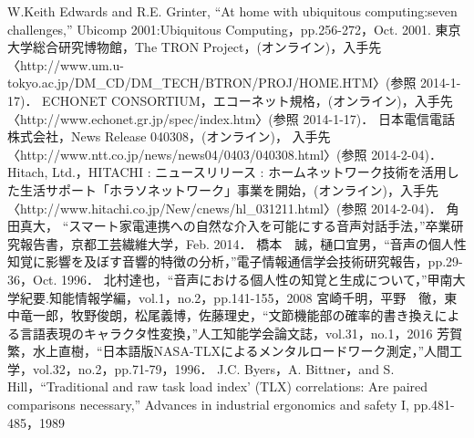 \documentclass[a4j,12pt,twoside]{jreport}
\begin{document}
\begin{thebibliography}{}
   W.Keith Edwards and R.E. Grinter, ``At home with ubiquitous computing:seven challenges,'' Ubicomp 2001:Ubiquitous Computing，pp.256-272，Oct. 2001.
   東京大学総合研究博物館，The TRON Project，(オンライン)，入手先〈http://www.um.u-tokyo.ac.jp/DM\_CD/DM\_TECH/BTRON/PROJ/HOME.HTM〉(参照 2014-1-17)．
   ECHONET CONSORTIUM，エコーネット規格，(オンライン)，入手先〈http://www.echonet.gr.jp/spec/index.htm〉(参照 2014-1-17)．
   日本電信電話株式会社，News Release 040308，(オンライン)， 入手先〈http://www.ntt.co.jp/news/news04/0403/040308.html〉(参照 2014-2-04)．
   Hitach, Ltd.，HITACHI : ニュースリリース : ホームネットワーク技術を活用した生活サポート「ホラソネットワーク」事業を開始，(オンライン)，入手先〈http://www.hitachi.co.jp/New/cnews/hl\_031211.html〉(参照 2014-2-04)．
   角田真大， ``スマート家電連携への自然な介入を可能にする音声対話手法，''卒業研究報告書，京都工芸繊維大学，Feb. 2014．
   橋本　誠，樋口宜男，``音声の個人性知覚に影響を及ぼす音響的特徴の分析，''電子情報通信学会技術研究報告，pp.29-36，Oct. 1996．
   北村達也，``音声における個人性の知覚と生成について，''甲南大学紀要.知能情報学編，vol.1，no.2，pp.141-155，2008
   宮崎千明，平野　徹，東中竜一郎，牧野俊朗，松尾義博，佐藤理史，``文節機能部の確率的書き換えによる言語表現のキャラクタ性変換，''人工知能学会論文誌，vol.31，no.1，2016
   芳賀　繁，水上直樹，``日本語版NASA-TLXによるメンタルロードワーク測定，''人間工学，vol.32，no.2，pp.71-79，1996．
   J.C. Byers，A. Bittner，and S. Hill，``Traditional and raw task load index' (TLX) correlations: Are paired comparisons necessary,'' Advances in industrial ergonomics and safety I, pp.481-485，1989
  
\end{thebibliography}
\appendix %
\end{document}
